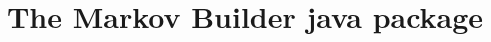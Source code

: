 \documentclass[10pt]{article}
\begin{document}
\title{The Markov Builder java package}


\end{document}
